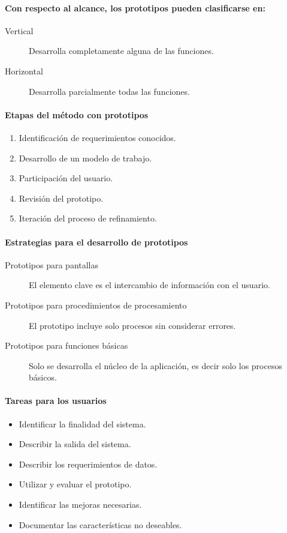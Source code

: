 \paragraph{Con respecto al alcance, los prototipos pueden clasificarse en:}
\begin{description}
\item[Vertical] Desarrolla completamente alguna de las funciones.
\item[Horizontal] Desarrolla parcialmente todas las funciones.
\end{description}
\paragraph{Etapas del método con prototipos}
\begin{enumerate}
\item Identificación de requerimientos conocidos.
\item Desarrollo de un modelo de trabajo.
\item Participación del usuario.
\item Revisión del prototipo.
\item Iteración del proceso de refinamiento.
\end{enumerate}
\paragraph{Estrategias para el desarrollo de prototipos}
\begin{description}
\item[Prototipos para pantallas] El elemento clave es el intercambio de información con el usuario.
\item[Prototipos para procedimientos de procesamiento] El prototipo incluye solo procesos sin considerar errores.
\item[Prototipos para funciones básicas] Solo se desarrolla el núcleo de la aplicación, es decir solo los procesos básicos.
\end{description}
\paragraph{Tareas para los usuarios}
\begin{itemize}
\item Identificar la finalidad del sistema.
\item Describir la salida del sistema.
\item Describir los requerimientos de datos.
\item Utilizar y evaluar el prototipo.
\item Identificar las mejoras necesarias.
\item Documentar las características no deseables.
\end{itemize}
